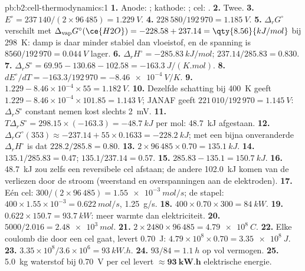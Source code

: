 \begin{solution}{pb:b2:cell-thermodynamics:1}
\textbf{1.} Anode: ; kathode: ;
cel: .
\textbf{2.} Twee.
\textbf{3.} $E^\circ = 237\,140/(2 \times 96\,485) = \qty{1.229}{V}$.
\textbf{4.} $228\,580/192\,970 = \qty{1.185}{V}$.
\textbf{5.} $\Delta_r G^\circ$ verschilt met $\Delta_{\text{vap}}G^\circ(\ce{H2O}) = -228.58 + 237.14 =
\qty{8.56}{kJ/mol}$ bij \qty{298}{K}: damp is daar minder stabiel dan vloeistof, en de
spanning is $8560/192\,970 = \qty{0.044}{V}$ lager.
\textbf{6.} $\Delta_r H^\circ = \qty{-285.83}{kJ/mol}$; $237.14/285.83 = 0.830$.
\textbf{7.} $\Delta_r S^\circ = 69.95 - 130.68 - 102.58 = \qty{-163.3}{J/(K.mol)}$.
\textbf{8.} $dE^\circ/dT = -163.3/192\,970 = \qty{-8.46e-4}{V/K}$.
\textbf{9.} $1.229 - 8.46 \times 10^{-4} \times 55 = \qty{1.182}{V}$.
\textbf{10.} Dezelfde schatting bij \qty{400}{K} geeft $1.229 - 8.46 \times 10^{-4}
\times 101.85 = \qty{1.143}{V}$; JANAF geeft $221\,010/192\,970 = \qty{1.145}{V}$:
$\Delta_r S^\circ$ constant nemen kost slechts \qty{2}{mV}.
\textbf{11.} $T\Delta_r S^\circ = 298.15 \times (-163.3) = \qty{-48.7}{kJ}$ per mol:
\qty{48.7}{kJ} afgestaan.
\textbf{12.} $\Delta_r G^\circ(353) \approx -237.14 + 55 \times 0.1633 =
\qty{-228.2}{kJ}$; met een bijna onveranderde $\Delta_r H^\circ$ is dat $228.2/285.8 = 0.80$.
\textbf{13.} $2 \times 96\,485 \times 0.70 = \qty{135.1}{kJ}$.
\textbf{14.} $135.1/285.83 = 0.47$; $135.1/237.14 = 0.57$.
\textbf{15.} $285.83 - 135.1 = \qty{150.7}{kJ}$.
\textbf{16.} \qty{48.7}{kJ} zou zelfs een reversibele cel afstaan; de andere
\qty{102.0}{kJ} komen van de verliezen door de stroom (weerstand en
overspanningen aan de elektroden).
\textbf{17.} Eén cel: $300/(2 \times 96\,485) = \qty{1.55e-3}{mol/s}$; de stapel:
$400 \times 1.55 \times 10^{-3} = \qty{0.622}{mol/s}$, \qty{1.25}{g/s}.
\textbf{18.} $400 \times 0.70 \times 300 = \qty{84}{kW}$.
\textbf{19.} $0.622 \times 150.7 = \qty{93.7}{kW}$: meer warmte dan elektriciteit.
\textbf{20.} $5000/2.016 = \qty{2.48e3}{mol}$.
\textbf{21.} $2 \times 2480 \times 96\,485 = \qty{4.79e8}{C}$.
\textbf{22.} Elke coulomb die door een cel gaat, levert \qty{0.70}{J}: $4.79 \times
10^8 \times 0.70 = \qty{3.35e8}{J}$.
\textbf{23.} $3.35 \times 10^8/3.6 \times 10^6 = \qty{93}{kW.h}$.
\textbf{24.} $93/84 = \qty{1.1}{h}$ op vol vermogen.
\textbf{25.} \qty{5.0}{kg} waterstof bij \qty{0.70}{V} per cel levert
$\boldsymbol{\approx \qty{93}{kW.h}}$ elektrische energie.
\end{solution}
